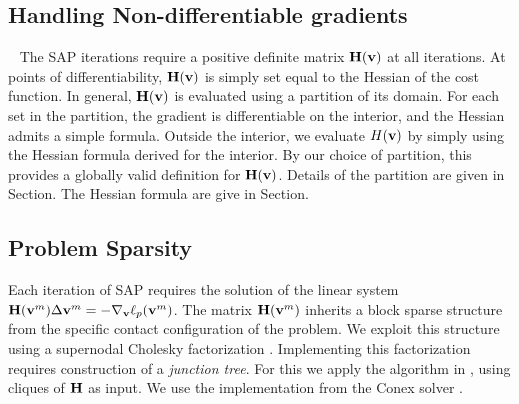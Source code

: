 \subsection{Handling Non-differentiable gradients}~\label{sec:NonDifferentiability}
The SAP iterations require a positive definite matrix ${\mathbf{H}}({\mathbf{v}})$ at all iterations.  At
points of differentiability, ${\mathbf{H}}({\mathbf{v}})$ is simply set equal to the Hessian of
the cost function. In general, ${\mathbf{H}}({\mathbf{v}})$ is evaluated using a partition
of its domain.  For each set in the partition, the gradient is differentiable on the
interior, and the Hessian admits a simple formula. Outside the interior, we
evaluate $H({\mathbf{v}})$ by simply using the Hessian formula derived for the interior. By
our choice of partition, this provides a globally valid definition for ${\mathbf{H}}({\mathbf{v}})$.  Details of the partition are given in Section{}.  The Hessian formula are
give in Section{}.
\subsection{Problem Sparsity}
\label{sec:problem_sparsity}




Each iteration of SAP requires the solution of the linear system
${\mathbf{H}}({\mathbf{v}}^m)\Delta{\mathbf{v}}^{m} = -\nabla_{\mathbf{v}}\ell_p({\mathbf{v}}^m)$.
The matrix ${\mathbf{H}}({\mathbf{v}}^m)$ inherits a block sparse structure from
the specific contact configuration of the problem. 
We exploit this structure using a supernodal Cholesky factorization \cite[\S
9]{bib:davis2016survey}. Implementing this factorization requires construction
of a \emph{junction tree}.  For this we apply the algorithm in
\cite{bib:smail2017junction}, using cliques of ${\mathbf{H}}$ as input. We
use the implementation from the Conex solver \cite{bib:permenter2020}.

